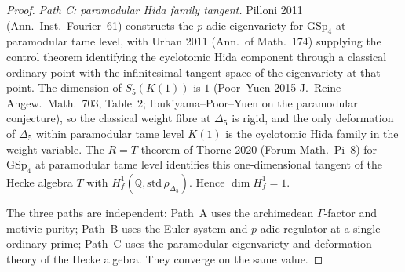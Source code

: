 \begin{proof}
\emph{Path C: paramodular Hida family tangent.}
Pilloni 2011 (\textup{Ann.~Inst.\ Fourier}~61) constructs the $p$-adic eigenvariety
for $\mathrm{GSp}_4$ at paramodular tame level, with Urban 2011
(\textup{Ann.~of Math.}~174) supplying the control theorem identifying the
cyclotomic Hida component through a classical ordinary point with the infinitesimal
tangent space of the eigenvariety at that point. The dimension of $S_5(K(1))$ is
$1$ (Poor--Yuen 2015 \textup{J.~Reine Angew.~Math.}~703, Table~$2$; Ibukiyama--Poor--Yuen
on the paramodular conjecture), so the classical weight fibre at $\Delta_5$ is rigid,
and the only deformation of $\Delta_5$ within paramodular tame level $K(1)$ is the
cyclotomic Hida family in the weight variable. The $R=T$ theorem of Thorne 2020
(\textup{Forum Math.\ Pi}~8) for $\mathrm{GSp}_4$ at paramodular tame level identifies
this one-dimensional tangent of the Hecke algebra $T$ with
$H^1_f(\mathbb{Q}, \mathrm{std}\,\rho_{\Delta_5})$. Hence $\dim H^1_f = 1$.

The three paths are independent: Path~A uses the archimedean $\Gamma$-factor and
motivic purity; Path~B uses the Euler system and $p$-adic regulator at a single
ordinary prime; Path~C uses the paramodular eigenvariety and deformation theory of
the Hecke algebra. They converge on the same value.
\end{proof}


